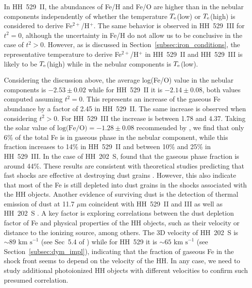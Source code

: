 \documentclass[fleqn,usenatbib]{mnras}
\begin{document}
In HH~529~II, the abundances of Fe/H and Fe/O are higher than in the nebular components independently of whether the temperature $T_{\rm e}$(low) or $T_{\rm e}$(high) is considered to derive Fe$^{2+}$/H$^{+}$. The same behavior is observed in HH~529~III for $t^2 = 0$, although the uncertainty in Fe/H do not allow us to be conclusive in the case of $t^2>0 $. However, as is discussed in Section~\ref{subsec:iron_conditions}, the representative temperature to derive Fe$^{2+}$/H$^{+}$ in HH~529~II and HH~529~III is likely to be $T_{\rm e}$(high) while in the nebular components is $T_{\rm e}$(low). 

Considering the discussion above, the average log(Fe/O) value in the nebular components is $-2.53 \pm 0.02$ while for HH~529~II it is $-2.14 \pm 0.08$, both values computed assuming $t^2 = 0$. This represents an increase of the gaseous Fe abundance by a factor of 2.45 in HH~529~II. The same increase is observed when considering $t^2> 0$. For HH~529~III the increase is  between 1.78 and 4.37. Taking the solar value of $\text{log(Fe/O)}=-1.28 \pm 0.08$ recommended by \citet{lodders19}, we find that only 6\% of the total Fe is in gaseous phase in the nebular component, while this fraction increases to 14\% in HH~529~II and between 10\% and 25\% in  HH~529~III. In the case of HH~202~S, \citet{mesadelgado09} found that the gaseous phase fraction is around 44\%. These results are consistent with theoretical studies predicting that fast shocks are effective at destroying dust grains \citep[see][and references therein]{jones94,mouri00}. However, this also indicate that most of the Fe is still depleted into dust grains in the shocks associated with the HH objects. Another evidence of surviving dust is the detection of thermal emission of dust at 11.7 $\mu$m coincident with HH~529~II and III as well as HH~202~S \citep{smith05}. A key factor is exploring correlations between the dust depletion factor of Fe and physical properties of the HH objects, such as their velocity or  distance to the ionizing source, among others. The 3D velocity of HH~202~S is  $\sim 89 \text{ km s}^{-1}$ (see Sec~5.4 of \citet{mesadelgado09}) while for HH~529 it is $\sim 65 \text{ km s}^{-1}$ (see Section~\ref{subsec:dym_impl}), indicating that the fraction of gaseous Fe in the shock front seems to depend on the velocity of the HH. In any case, we need to study additional photoionized HH objects with different velocities to confirm such  presumed correlation. 
\end{document}
